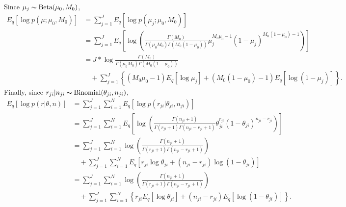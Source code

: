 \documentclass[11pt,reqno]{amsart}
\begin{document}
%
Since $\mu_j \thicksim \text{Beta}(\mu_0, M_0)$,
\begin{equation}
\begin{split}
E_q \left[ \log p\left(\mu ; \mu_0, M_0 \right)\right] &= \sum_{j=1}^{J} E_q  \left[ \log p\left( \mu_j; \mu_0, M_0 \right) \right] \\
&= \sum_{j=1}^{J} E_q  \left[ \log \left( \frac{ \Gamma(M_0) } { \Gamma(\mu_0 M_0) \Gamma(M_0 (1-\mu_0)) } \mu_j^{M_0\mu_0 -1} (1 - \mu_j)^{M_0 ( 1 - \mu_0) - 1} \right) \right] \\
&= J* \log \frac{ \Gamma(M_0) } { \Gamma(\mu_0 M_0) \Gamma(M_0 (1-\mu_0))} \\
&\quad + \sum_{j=1}^{J} \left\lbrace (M_0\mu_0 -1)E_q  \left[ \log \mu_j \right] + (M_0 ( 1 - \mu_0) - 1) E_q  \left[ \log (1 - \mu_j)\right]\right\rbrace.
\end{split}
\end{equation}
%
Finally, since $r_{ji}|n_{ji}\thicksim \text{Binomial}(\theta_{ji}, n _{ji})$,
\begin{equation}
\begin{split}
E_q \left[ \log p\left(r | \theta, n \right)\right] &= \sum_{j=1}^{J} \sum_{i=1}^{N} E_q  \left[ \log p \left( r_{ji} | \theta_{ji}, n_{ji} \right) \right] \\
&= \sum_{j=1}^{J} \sum_{i=1}^{N}  E_q  \left[ \log \left( \frac{ \Gamma(n_{ji}+1) } { \Gamma(r_{ji}+1) \Gamma( n_{ji} - r_{ji} + 1 ) } \theta_{ji}^{r_{ji}} (1 - \theta_{ji})^{n_{ji} - r_{ji}} \right) \right] \\
&= \sum_{j=1}^{J} \sum_{i=1}^{N} \log \left( \frac{ \Gamma(n_{ji}+1) } { \Gamma(r_{ji}+1) \Gamma( n_{ji} - r_{ji} + 1 ) }\right)  \\
&\quad + \sum_{j=1}^{J} \sum_{i=1}^{N}  E_q  \left[ r_{ji} \log \theta_{ji} + (n_{ji} - r_{ji}) \log (1 - \theta_{ji}) \right] \\
&= \sum_{j=1}^{J} \sum_{i=1}^{N} \log \left( \frac{ \Gamma(n_{ji}+1) } { \Gamma(r_{ji}+1) \Gamma( n_{ji} - r_{ji} + 1 ) }\right)  \\
&\quad + \sum_{j=1}^{J} \sum_{i=1}^{N} \left\lbrace r_{ji} E_q \left[ \log \theta_{ji} \right] + (n_{ji} - r_{ji}) E_q  \left[  \log (1 - \theta_{ji}) \right] \right\rbrace. \\
\end{split}
\end{equation}
\end{document}
